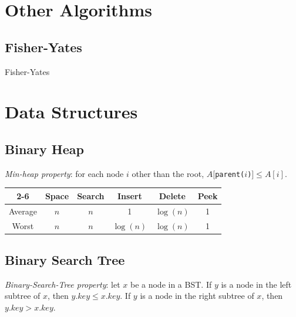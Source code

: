 \documentclass[a4paper, 12pt]{article}
\begin{document}
\section{Other Algorithms}

  \subsection{Fisher-Yates}

\IncMargin{2em}
\begin{algorithm}[H]
\caption{Fisher-Yates}
\vspace{0.1cm}
\Indm
{}
\Indp
\vspace{0.1cm}
\end{algorithm}
\DecMargin{2em}

\section{Data Structures}

	\subsection{Binary Heap}

\textit{Min-heap property}: for each node $i$ other than the root, $A[$\texttt{parent(}$i$\texttt{)}$] \le A[i]$.

\begin{center}	
\begin{tabular}{| c | c | c | c | c | c |}
\cline{2-6}
\multicolumn{1}{c |}{} & Space & Search & Insert & Delete & Peek \\
\hline
Average & $n$ & $n$ & 1 & $\log(n)$ & 1 \\
\hline
Worst & $n$ & $n$ & $\log(n)$ & $\log(n)$ & 1 \\
\hline
\end{tabular}
\end{center}

  \subsection{Binary Search Tree}

\textit{Binary-Search-Tree property}: let $x$ be a node in a BST. If $y$ is a node in the left subtree of $x$, then $y.key \le x.key$. If $y$ is a node in the right subtree of $x$, then $y.key > x.key$.
\end{document}
